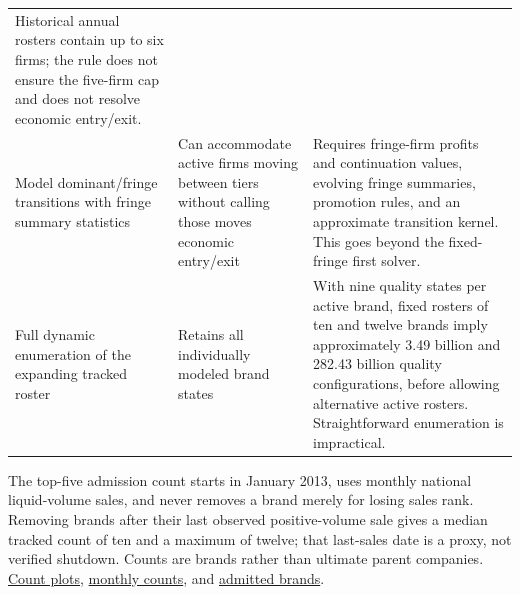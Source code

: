 \documentclass[10pt,]{article}
\begin{document}
\begin{longtable}[]{@{}lll@{}}
\begin{minipage}[t]{0.47\columnwidth}
Historical annual rosters contain up to six firms; the rule does not
ensure the five-firm cap and does not resolve economic entry/exit.\strut
\end{minipage}\tabularnewline
\begin{minipage}[t]{0.18\columnwidth}\raggedright\strut
Model dominant/fringe transitions with fringe summary statistics\strut
\end{minipage} & \begin{minipage}[t]{0.13\columnwidth}\raggedright\strut
Can accommodate active firms moving between tiers without calling those
moves economic entry/exit\strut
\end{minipage} & \begin{minipage}[t]{0.47\columnwidth}\raggedright\strut
Requires fringe-firm profits and continuation values, evolving fringe
summaries, promotion rules, and an approximate transition kernel. This
goes beyond the fixed-fringe first solver.\strut
\end{minipage}\tabularnewline
\begin{minipage}[t]{0.18\columnwidth}\raggedright\strut
Full dynamic enumeration of the expanding tracked roster\strut
\end{minipage} & \begin{minipage}[t]{0.13\columnwidth}\raggedright\strut
Retains all individually modeled brand states\strut
\end{minipage} & \begin{minipage}[t]{0.47\columnwidth}\raggedright\strut
With nine quality states per active brand, fixed rosters of ten and
twelve brands imply approximately 3.49 billion and 282.43 billion
quality configurations, before allowing alternative active rosters.
Straightforward enumeration is impractical.\strut
\end{minipage}\tabularnewline
\bottomrule
\end{longtable}

The top-five admission count starts in January 2013, uses monthly
national liquid-volume sales, and never removes a brand merely for
losing sales rank. Removing brands after their last observed
positive-volume sale gives a median tracked count of ten and a maximum
of twelve; that last-sales date is a proxy, not verified shutdown.
Counts are brands rather than ultimate parent companies.
\href{../../output/dynamic_entry_exit/top5_admission_roster_2026-11-04/tracked_roster_counts.pdf}{Count
plots},
\href{../../output/dynamic_entry_exit/top5_admission_roster_2026-11-04/demand_eligible_monthly_counts.csv}{monthly
counts}, and
\href{../../output/dynamic_entry_exit/top5_admission_roster_2026-11-04/demand_eligible_admitted_brands.csv}{admitted
brands}.
\end{document}
